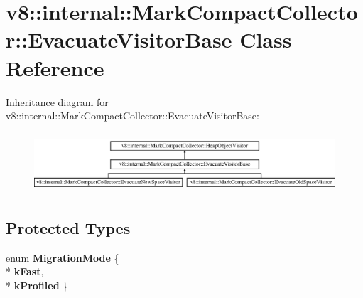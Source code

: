 \hypertarget{classv8_1_1internal_1_1_mark_compact_collector_1_1_evacuate_visitor_base}{}\section{v8\+:\+:internal\+:\+:Mark\+Compact\+Collector\+:\+:Evacuate\+Visitor\+Base Class Reference}
\label{classv8_1_1internal_1_1_mark_compact_collector_1_1_evacuate_visitor_base}
Inheritance diagram for v8\+:\+:internal\+:\+:Mark\+Compact\+Collector\+:\+:Evacuate\+Visitor\+Base\+:\begin{figure}[H]
\begin{center}
\leavevmode
\includegraphics[height=2.252011cm]{classv8_1_1internal_1_1_mark_compact_collector_1_1_evacuate_visitor_base}
\end{center}
\end{figure}
\subsection*{Protected Types}
\begin{DoxyCompactItemize}
\item 
enum {\bfseries Migration\+Mode} \{ \\*
{\bfseries k\+Fast}, 
\\*
{\bfseries k\+Profiled}
 \}\hypertarget{classv8_1_1internal_1_1_mark_compact_collector_1_1_evacuate_visitor_base_a6ad5e70bef4df731773b3caae1908a13}{}\label{classv8_1_1internal_1_1_mark_compact_collector_1_1_evacuate_visitor_base_a6ad5e70bef4df731773b3caae1908a13}

\end{DoxyCompactItemize}
